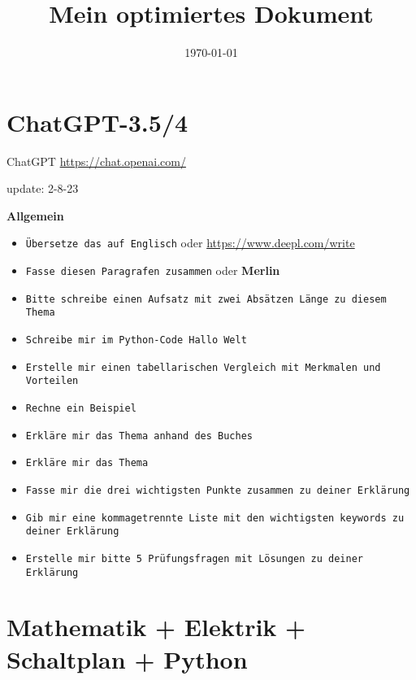 \documentclass[12pt,a4paper]{scrartcl}
\title{Mein optimiertes Dokument}
\date{\today}
\newcommand{\tightlist}{
  \setlength{\itemsep}{0pt}\setlength{\parskip}{0pt}
}
\begin{document}
\maketitle

\hypertarget{chatgpt-3.54}{%
\section{ChatGPT-3.5/4}\label{chatgpt-3.54}}

ChatGPT \url{https://chat.openai.com/}

update: 2-8-23

\textbf{Allgemein}

\begin{itemize}
\tightlist
\item
  {\lstinline!Übersetze das auf Englisch!} oder
  \url{https://www.deepl.com/write}
\item
  {\lstinline!Fasse diesen Paragrafen zusammen!} oder
  \textbf{Merlin}
\item
  {\lstinline!Bitte schreibe einen Aufsatz mit zwei Absätzen Länge zu diesem Thema!}
\item
  {\lstinline!Schreibe mir im Python-Code Hallo Welt!}
\item
  {\lstinline!Erstelle mir einen tabellarischen Vergleich mit Merkmalen und Vorteilen!}
\item
  {\lstinline!Rechne ein Beispiel!}
\item
  {\lstinline!Erkläre mir das Thema anhand des Buches!}
\item
  {\lstinline!Erkläre mir das Thema!}
\item
  {\lstinline!Fasse mir die drei wichtigsten Punkte zusammen zu deiner Erklärung!}
\item
  {\lstinline!Gib mir eine kommagetrennte Liste mit den wichtigsten keywords zu deiner Erklärung!}
\item
  {\lstinline!Erstelle mir bitte 5 Prüfungsfragen mit Lösungen zu deiner Erklärung!}
\end{itemize}

\hypertarget{mathematik-elektrik-schaltplan-python}{%
\section{Mathematik + Elektrik + Schaltplan +
Python}\label{mathematik-elektrik-schaltplan-python}}
\end{document}
